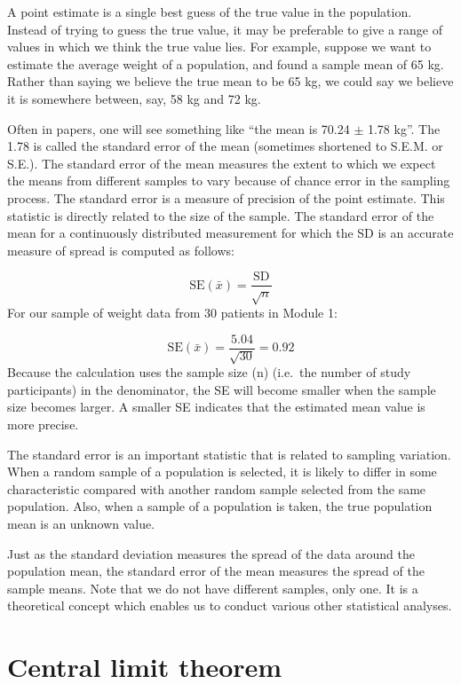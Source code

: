 \documentclass[
]{memoir}
\begin{document}
A point estimate is a single best guess of the true value in the population. Instead of trying to guess the true value, it may be preferable to give a range of values in which we think the true value lies. For example, suppose we want to estimate the average weight of a population, and found a sample mean of 65 kg. Rather than saying we believe the true mean to be 65 kg, we could say we believe it is somewhere between, say, 58 kg and 72 kg.

Often in papers, one will see something like ``the mean is 70.24 \(\pm\) 1.78 kg''. The 1.78 is called the standard error of the mean (sometimes shortened to S.E.M. or S.E.). The standard error of the mean measures the extent to which we expect the means from different samples to vary because of chance error in the sampling process. The standard error is a measure of precision of the point estimate. This statistic is directly related to the size of the sample. The standard error of the mean for a continuously distributed measurement for which the SD is an accurate measure of spread is computed as follows:

\[ \text{SE}(\bar{x}) = \frac{\text{SD}}{\sqrt{n}} \]
For our sample of weight data from 30 patients in Module 1:

\[ \text{SE}(\bar{x}) = \frac{\text{5.04}}{\sqrt{30}} = 0.92 \]
Because the calculation uses the sample size (n) (i.e.~the number of study participants) in the denominator, the SE will become smaller when the sample size becomes larger. A smaller SE indicates that the estimated mean value is more precise.

The standard error is an important statistic that is related to sampling variation. When a random sample of a population is selected, it is likely to differ in some characteristic compared with another random sample selected from the same population. Also, when a sample of a population is taken, the true population mean is an unknown value.

Just as the standard deviation measures the spread of the data around the population mean, the standard error of the mean measures the spread of the sample means. Note that we do not have different samples, only one. It is a theoretical concept which enables us to conduct various other statistical analyses.

\hypertarget{central-limit-theorem}{%
\section{Central limit theorem}\label{central-limit-theorem}}
\end{document}
